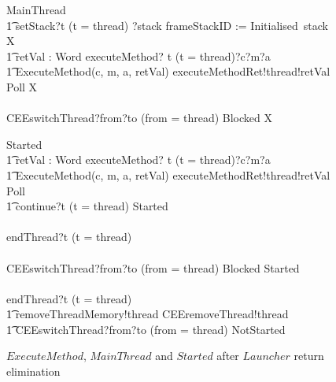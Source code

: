 \begin{figure}[tp!]
  \begin{circusaction}
    MainThread \circdef \\
    \t1 setStack?t \prefixcolon (t = thread) ?stack \then frameStackID := Initialised~stack \circseq \circmu X \circspot \\
    \t1 \circblockbegin
    \circvar retVal : Word \circspot
    executeMethod? t \prefixcolon (t = thread)?c?m?a \then {} \\
    \t1 ExecuteMethod(c, m, a, retVal) \circseq
    executeMethodRet!thread!retVal \then Poll \circseq  X \\
    {} \extchoice {} \\
    CEEswitchThread?from?to \prefixcolon (from = thread) \then Blocked \circseq X
    \circblockend
  \end{circusaction}
  
  \begin{circusaction}
    Started \circdef \\
    \t1 \circblockbegin
    \circvar retVal : Word \circspot executeMethod? t \prefixcolon (t = thread)?c?m?a \then {} \\
    \t1 ExecuteMethod(c, m, a, retVal) \circseq executeMethodRet!thread!retVal \then Poll \circseq \\
    \t1 \circblockbegin
    continue?t \prefixcolon (t = thread) \then Started \\
    {} \extchoice {} \\
    endThread?t \prefixcolon (t = thread) \then \Skip
    \circblockend \\
    {} \extchoice {} \\
    CEEswitchThread?from?to \prefixcolon (from = thread) \then Blocked \circseq Started \\
    {} \extchoice {} \\
    endThread?t \prefixcolon (t = thread) \then \Skip
    \circblockend \circseq \\
    \t1 removeThreadMemory!thread \then CEEremoveThread!thread \\
    \t1 {} \then CEEswitchThread?from?to \prefixcolon (from = thread) \then NotStarted
  \end{circusaction}
  \caption{$ExecuteMethod$, $MainThread$ and $Started$ after
    $Launcher$ return elimination}
  \label{efs-eliminate-returns-example-figure1}
\end{figure}

